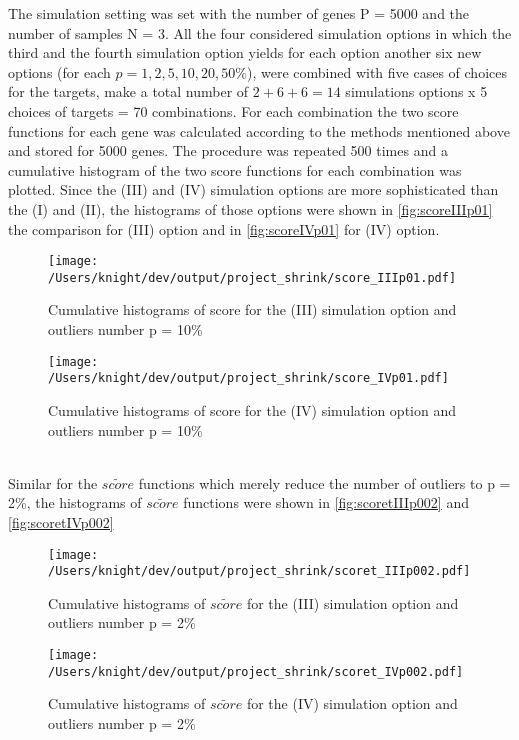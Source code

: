 The simulation setting was set with the number of genes P = 5000 and the number of samples N = 3. All the four considered simulation options in which the third and the fourth simulation option yields for each option another six new options (for each $p = 1, 2, 5, 10, 20, 50\%$), were combined with five cases of choices for the targets, make a total number of $2 + 6 + 6 = 14$ simulations options x 5 choices of targets = 70 combinations. For each combination the two score functions for each gene was calculated according to the methods mentioned above and stored for 5000 genes. The procedure was repeated 500 times and a cumulative histogram of the two score functions for each combination was plotted. Since the (III) and (IV) simulation options are more sophisticated than the (I) and (II), the histograms of those options were shown in \autoref{fig:scoreIIIp01} the comparison for (III) option and in \autoref{fig:scoreIVp01} for (IV) option.\\
\begin{figure}[h!tp]
	\centering
	\texttt{[image: /Users/knight/dev/output/project\_shrink/score\_IIIp01.pdf]}
	\caption[a]{Cumulative histograms of score for the (III) simulation option and outliers number p = 10\% }
	\label{fig:scoreIIIp01}
\end{figure}
\begin{figure}[h!p]
	\centering
	\texttt{[image: /Users/knight/dev/output/project\_shrink/score\_IVp01.pdf]}
	\caption[a]{Cumulative histograms of score for the (IV) simulation option and outliers number p = 10\% }
	\label{fig:scoreIVp01}	
\end{figure}
\\Similar for the $\widetilde{score}$ functions which merely reduce the number of outliers to p = 2\%, the histograms of $\widetilde{score}$ functions were shown in \autoref{fig:scoretIIIp002} and \autoref{fig:scoretIVp002}\\
\begin{figure}[h!t]
	\centering
	\texttt{[image: /Users/knight/dev/output/project\_shrink/scoret\_IIIp002.pdf]}
	\caption[a]{Cumulative histograms of $\widetilde{score}$ for the (III) simulation option and outliers number p = 2\% }
	\label{fig:scoretIIIp002}
\end{figure}
\begin{figure}[h!t]
	\centering
	\texttt{[image: /Users/knight/dev/output/project\_shrink/scoret\_IVp002.pdf]}
	\caption[a]{Cumulative histograms of $\widetilde{score}$ for the (IV) simulation option and outliers number p = 2\% }
	\label{fig:scoretIVp002}
\end{figure}
